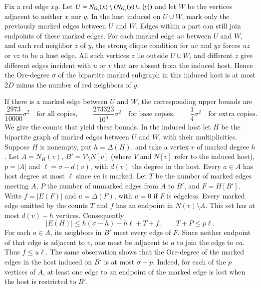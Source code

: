 \documentclass[preprint,11pt,numbers]{elsarticle-arxiv}
\numberwithin{equation}{section}
\theoremstyle{definition}
\begin{document}
Fix a red edge $xy$. Let $U=N_{G_{\rm s}}(x)\setminus (N_{G_{\rm s}}(y)\cup\{y\})$
and let $W$ be the vertices adjacent to neither $x$ nor $y$. In the
host induced on $U\cup W$, mark only the previously marked edges
between $U$ and $W$. Edges within a part can still join endpoints of
these marked edges. For each marked edge $uv$ between $U$ and $W$, and
each red neighbor $z$ of $y$, the strong clique condition for $uv$
and $yz$ forces $uz$ or $vz$ to be a host edge. All such vertices $z$ lie
outside $U\cup W$, and different $z$ give different edges incident
with $u$ or $v$ that are absent from the induced host. Hence the Ore-degree $\sigma$ of the bipartite
marked subgraph in this induced host is at most $2D$ minus the
number of red neighbors of $y$.

If there is a marked edge between $U$ and $W$, the corresponding
upper bounds are
\[
 \frac{2973}{10000}\sigma^2\quad\text{for all copies},\qquad
 \frac{273323}{10^6}\sigma^2\quad\text{for base copies},\qquad
 \frac14\sigma^2\quad\text{for extra copies}.
\]
We give the counts that yield these bounds. In the induced host
let $H$ be the bipartite graph of marked edges between $U$ and $W$,
with their multiplicities. Suppose $H$ is nonempty, put $h=\Delta(H)$, and take
a vertex $v$ of marked degree $h$. Let $A=N_H(v)$,
$B'=V\setminus N[v]$ (where $V$ and $N[v]$ refer to the induced
host), $p=|A|$ and $\ell=\sigma-d(v)$, with $d(v)$ the degree in
the host. Every $a\in A$ has host degree at most $\ell$ since $va$
is marked. Let $T$ be the number of marked edges meeting $A$,
$P$ the number of unmarked edges from $A$ to $B'$, and
$F=H[B']$. Write $f=|E(F)|$ and $u=\Delta(F)$, with $u=0$ if
$F$ is edgeless. Every marked edge omitted by the counts $T$ and
$f$ has an endpoint in $N(v)\setminus A$. This set has at most
$d(v)-h$ vertices. Consequently
\[
 |E(H)|\leq h(\sigma-h)-h\ell+T+f,\qquad T+P\leq p\ell .
\]
For each $a\in A$, its neighbors in $B'$ meet every edge of $F$.
Since neither endpoint of that edge is adjacent to $v$, one must
be adjacent to $a$ to join the edge to $va$. Thus $f\leq u\ell$.
The same observation shows that the Ore-degree of the marked edges
in the host induced on $B'$ is at most $\sigma-p$. Indeed, for
each of the $p$ vertices of $A$, at least one edge to an endpoint
of the marked edge is lost when the host is restricted to $B'$.
\end{document}
